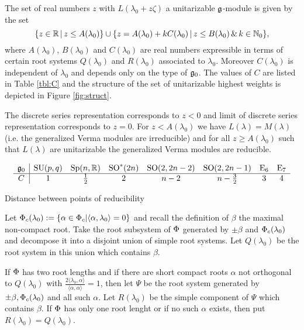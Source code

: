 \begin{theorem}
 The set of real numbers $z$ with $L(\lambda_0 + z\zeta)$ a unitarizable $\mathfrak{g}$-module is given by the set
\[
  \{z \in \mathbb{R}\, |\, z \leq A(\lambda_0)\} \cup \{ z=A(\lambda_0) + k C(\lambda_0)\,|\, z \leq B(\lambda_0) \,\&\, k\in \mathbb{N}_0\},
\]
where $A(\lambda_0)$, $B(\lambda_0)$ and $C(\lambda_0)$ are real numbers expressible in terms of certain root systems $Q(\lambda_0)$ and $R(\lambda_0)$ associated to $\lambda_0$. Moreover $C(\lambda_0)$ is independent of $\lambda_0$ and depends only on the type of $\mathfrak{g}_0$. The values of $C$ are listed in Table \ref{tbl:C} and the structure of the set of unitarizable highest weights is depicted in Figure \ref{fig:struct}.
	
The discrete series representation corresponds to $z <0$ and limit of discrete series representation corresponds to $z=0$. For $z  < A(\lambda_0)$ we have $L(\lambda) = M(\lambda)$ (i.e. the generalized Verma modules are irreducible) and for all $z \geq A(\lambda_0)$ such that $L(\lambda)$ are unitarizable the generalized Verma modules are reducible.%

\begin{table}[h]\label{tbl:C}
\[\begin{array}{c|ccccccc}
\mathfrak{g}_0 & \mathrm{SU}(p,q) & \mathrm{Sp}(n,\mathbb{R}) & \mathrm{SO}^*(2n) & \mathrm{SO}(2,2n-2) & \mathrm{SO}(2,2n-1) & \mathrm{E}_6 & \mathrm{E}_7\\\hline
C & 1 & \frac{1}{2} & 2 & n-2 & n-\frac{3}{2} & 3 & 4
\end{array}\]\caption{Distance between points of reducibility}
\end{table}
\end{theorem}

Let $\Phi_c(\lambda_0) := \{ \alpha \in \Phi_c | \langle \alpha,\lambda_0 \rangle = 0 \}$ and recall the definition of $\beta$ the maximal non-compact root. Take the root subsystem of $\Phi$ generated by $\pm \beta$ and $\Phi_c(\lambda_0)$ and decompose it into a disjoint union of simple root systems. Let $Q(\lambda_0)$ be the root system in this union which contains $\beta$.

If $\Phi$ has two root lengths and if there are short compact roots $\alpha$ not orthogonal to $Q(\lambda_0)$ with $\frac{2 \langle \lambda_0,\alpha \rangle}{\langle \alpha, \alpha \rangle}  =1$, then let $\Psi$ be the root system generated by $\pm \beta, \Phi_c(\lambda_0)$ and all such $\alpha$. Let $R(\lambda_0)$ be the simple component of $\Psi$ which contains $\beta$. If $\Phi$ has only one root lenght or if no such $\alpha$ exists, then put $R(\lambda_0) = Q(\lambda_0)$.

